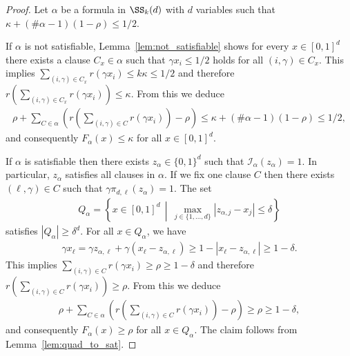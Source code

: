 \documentclass{amsart}[11pt]
\numberwithin{equation}{section}
\newcommand{\interpretation}{\mathcal{I}}
\numberwithin{theorem}{section}
\begin{document}
\begin{proof}
    Let $\alpha$ be a formula in $\SS_k(d)$ with $d$ variables such that $\kappa + (\# \alpha - 1)(1 - \rho) \leq 1/2$.

    If $\alpha$ is not satisfiable, Lemma~\ref{lem:not_satisfiable} shows for every $x \in [0, 1]^d$ there exists a clause $C_x \in \alpha$ such that $\gamma x_i \leq 1/2$ holds for all $(i, \gamma) \in C_x$. This implies $\sum_{(i, \gamma) \in C_x} r(\gamma x_i) \leq k\kappa \leq 1/2$ and therefore $r\left(\sum_{(i, \gamma) \in C_x} r(\gamma x_i)\right) \leq \kappa$. From this we deduce
    \begin{align*}
        \rho + \sum_{C \in \alpha} \left(r\left(\sum_{(i, \gamma) \in C} r\left(\gamma x_i\right) \right) - \rho  \right) \leq \kappa + (\# \alpha - 1)(1 - \rho) \leq 1/2,
    \end{align*}
    and consequently $F_\alpha(x) \leq \kappa$ for all $x \in [0, 1]^d$.

    If $\alpha$ is satisfiable then there exists $z_\alpha \in \{0, 1\}^d$ such that $\interpretation_{\alpha}(z_\alpha) = 1$. In particular, $z_\alpha$ satisfies all clauses in $\alpha$. If we fix one clause $C$ then there exists $(\ell, \gamma) \in C$ such that $\gamma \pi_{d, \ell}(z_\alpha) = 1$.
    The set 
    \begin{align*}
        Q_\alpha = \left\{x \in [0, 1]^d \, \middle| \, \max_{j \in \{1, \ldots, d\}} |z_{\alpha, j} - x_j| \leq \delta\right\}
    \end{align*}
    satisfies $|Q_\alpha| \geq \delta^d$. For all $x \in Q_\alpha$, we have 
    \begin{align*}
        \gamma x_\ell = \gamma z_{\alpha, \ell} + \gamma \left(x_\ell - z_{\alpha, \ell}\right) \geq 1 - |x_\ell - z_{\alpha, \ell}| \geq 1 - \delta.
    \end{align*}
    This implies $\sum_{(i, \gamma) \in C} r(\gamma x_i) \geq \rho \geq 1 - \delta$ and therefore $r\left(\sum_{(i, \gamma) \in C} r\left(\gamma x_i\right) \right) \geq \rho$. From this we deduce
    \begin{align*}
        \rho + \sum_{C \in \alpha} \left(r\left(\sum_{(i, \gamma) \in C} r\left(\gamma x_i\right) \right) - \rho  \right) \geq \rho \geq 1 - \delta,
    \end{align*}
    and consequently $F_\alpha(x) \geq \rho$ for all $x \in Q_\alpha$.
    The claim follows from Lemma~\ref{lem:quad_to_sat}.
\end{proof}
\end{document}
